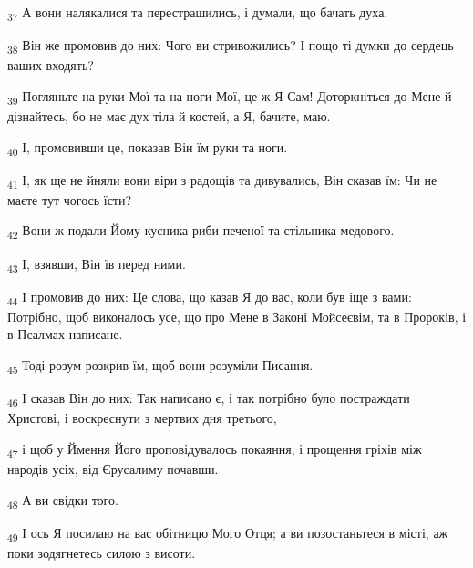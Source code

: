 \begin{tcolorbox}
\textsubscript{37} А вони налякалися та перестрашились, і думали, що бачать духа.
\end{tcolorbox}
\begin{tcolorbox}
\textsubscript{38} Він же промовив до них: Чого ви стривожились? І пощо ті думки до сердець ваших входять?
\end{tcolorbox}
\begin{tcolorbox}
\textsubscript{39} Погляньте на руки Мої та на ноги Мої, це ж Я Сам! Доторкніться до Мене й дізнайтесь, бо не має дух тіла й костей, а Я, бачите, маю.
\end{tcolorbox}
\begin{tcolorbox}
\textsubscript{40} І, промовивши це, показав Він їм руки та ноги.
\end{tcolorbox}
\begin{tcolorbox}
\textsubscript{41} І, як ще не йняли вони віри з радощів та дивувались, Він сказав їм: Чи не маєте тут чогось їсти?
\end{tcolorbox}
\begin{tcolorbox}
\textsubscript{42} Вони ж подали Йому кусника риби печеної та стільника медового.
\end{tcolorbox}
\begin{tcolorbox}
\textsubscript{43} І, взявши, Він їв перед ними.
\end{tcolorbox}
\begin{tcolorbox}
\textsubscript{44} І промовив до них: Це слова, що казав Я до вас, коли був іще з вами: Потрібно, щоб виконалось усе, що про Мене в Законі Мойсеєвім, та в Пророків, і в Псалмах написане.
\end{tcolorbox}
\begin{tcolorbox}
\textsubscript{45} Тоді розум розкрив їм, щоб вони розуміли Писання.
\end{tcolorbox}
\begin{tcolorbox}
\textsubscript{46} І сказав Він до них: Так написано є, і так потрібно було постраждати Христові, і воскреснути з мертвих дня третього,
\end{tcolorbox}
\begin{tcolorbox}
\textsubscript{47} і щоб у Ймення Його проповідувалось покаяння, і прощення гріхів між народів усіх, від Єрусалиму почавши.
\end{tcolorbox}
\begin{tcolorbox}
\textsubscript{48} А ви свідки того.
\end{tcolorbox}
\begin{tcolorbox}
\textsubscript{49} І ось Я посилаю на вас обітницю Мого Отця; а ви позостаньтеся в місті, аж поки зодягнетесь силою з висоти.
\end{tcolorbox}
